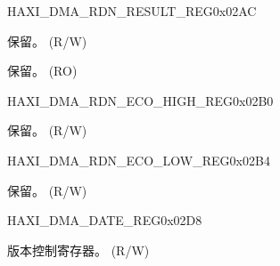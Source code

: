 \begin{register}{H}{AXI\_DMA\_RDN\_RESULT\_REG}{0x02AC}\label{regdesc:AXIDMARDNRESULTREG}
%
%
%
\regnewline%
\begin{regdesc}\begin{reglist}
\label{fielddesc:AXIDMARDNENA}\item [AXI\_DMA\_RDN\_ENA] 保留。 (R/W)
\label{fielddesc:AXIDMARDNRESULT}\item [AXI\_DMA\_RDN\_RESULT] 保留。 (RO)
\end{reglist}\end{regdesc}
\end{register}


\begin{register}{H}{AXI\_DMA\_RDN\_ECO\_HIGH\_REG}{0x02B0}\label{regdesc:AXIDMARDNECOHIGHREG}
%
\regnewline%
\begin{regdesc}\begin{reglist}
\label{fielddesc:AXIDMARDNECOHIGH}\item [AXI\_DMA\_RDN\_ECO\_HIGH] 保留。 (R/W)
\end{reglist}\end{regdesc}
\end{register}


\begin{register}{H}{AXI\_DMA\_RDN\_ECO\_LOW\_REG}{0x02B4}\label{regdesc:AXIDMARDNECOLOWREG}
%
\regnewline%
\begin{regdesc}\begin{reglist}
\label{fielddesc:AXIDMARDNECOLOW}\item [AXI\_DMA\_RDN\_ECO\_LOW] 保留。 (R/W)
\end{reglist}\end{regdesc}
\end{register}


\begin{register}{H}{AXI\_DMA\_DATE\_REG}{0x02D8}\label{regdesc:AXIDMADATEREG}
%
\regnewline%
\begin{regdesc}\begin{reglist}
\label{fielddesc:AXIDMADATE}\item [AXI\_DMA\_DATE] 版本控制寄存器。 (R/W)
\end{reglist}\end{regdesc}
\end{register}
